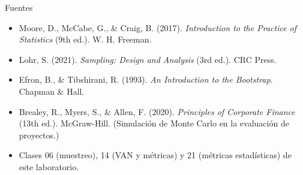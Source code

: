 \documentclass[aspectratio=169,10pt]{beamer}
\begin{document}
\begin{frame}{Fuentes}
\small
\begin{itemize}
  \item Moore, D., McCabe, G., \& Craig, B. (2017). \emph{Introduction to the Practice of Statistics} (9th ed.). W. H. Freeman.
  \item Lohr, S. (2021). \emph{Sampling: Design and Analysis} (3rd ed.). CRC Press.
  \item Efron, B., \& Tibshirani, R. (1993). \emph{An Introduction to the Bootstrap}. Chapman \& Hall.
  \item Brealey, R., Myers, S., \& Allen, F. (2020). \emph{Principles of Corporate Finance} (13th ed.). McGraw-Hill. (Simulación de Monte Carlo en la evaluación de proyectos.)
  \item Clases 06 (muestreo), 14 (VAN y métricas) y 21 (métricas estadísticas) de este laboratorio.
\end{itemize}
\end{frame}
\end{document}

